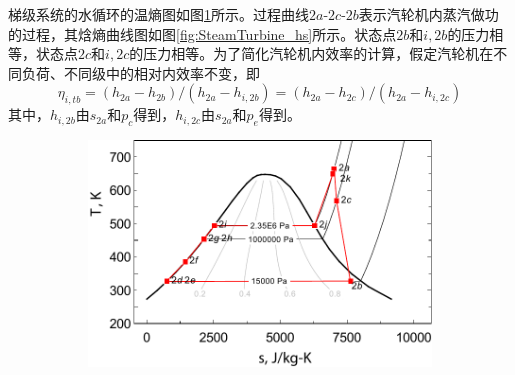 梯级系统的水循环的温熵图如图\ref{fig:Ts_Water1}所示。过程曲线$2a$-$2c$-$2b$表示汽轮机内蒸汽做功的过程，其焓熵曲线图如图\ref{fig:SteamTurbine_hs}所示。状态点$2b$和$i,2b$的压力相等，状态点$2c$和$i,2c$的压力相等。为了简化汽轮机内效率的计算，假定汽轮机在不同负荷、不同级中的相对内效率不变，即
\begin{equation}
      \eta_{i,tb} =(h_{2a}-h_{2b})/(h_{2a}-h_{i,2b}) = (h_{2a}-h_{2c})/(h_{2a}-h_{i,2c})
\end{equation}
其中，$h_{i,2b}$由$s_{2a}$和$p_c$得到，$h_{i,2c}$由$s_{2a}$和$p_e$得到。

\noindent \begin{figure}[htbp]
\centering
	\begin{subfigure}[b]{0.6\columnwidth}
	\includegraphics[width = \columnwidth]{fig/T-s_Water.pdf}
	\caption{}\label{fig:Ts_Water1}
	\end{subfigure}
	~
\begin{subfigure}[b]{0.28\columnwidth}

\end{subfigure}
\end{figure}

